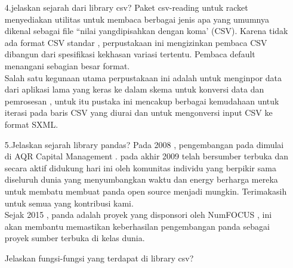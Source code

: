 \documentclass[10pt]{article}
\begin{document}
\begin{enumerate}
\item[4.jelaskan sejarah dari library csv?]
Paket csv-reading untuk racket menyediakan utilitas untuk membaca berbagai jenis apa yang umumnya dikenal sebagai file “nilai yangdipisahkan dengan koma’ (CSV). Karena tidak ada format CSV standar , perpustakaan ini mengizinkan pembaca CSV dibangun dari spesifikasi kekhasan variasi tertentu. Pembaca default menangani sebagian besar format.\\

Salah satu kegunaan utama perpustakaan ini adalah untuk menginpor data dari aplikasi lama yang keras ke dalam skema untuk konversi data dan pemrosesan , untuk itu pustaka ini mencakup berbagai kemudahaan  untuk iterasi pada baris CSV yang diurai dan untuk mengonversi input CSV ke format SXML.\\

\item[5.Jelaskan sejarah library pandas?]
Pada 2008 , pengembangan pada dimulai di AQR Capital Management . pada akhir 2009 telah bersumber terbuka dan secara aktif didukung hari ini oleh komunitas individu yang berpikir sama diseluruh dunia yang menyumbangkan waktu dan energy berharga mereka untuk membatu membuat panda open source menjadi mungkin. Terimakasih untuk semua yang kontribusi kami.\\

Sejak 2015 , panda adalah proyek yang disponsori oleh NumFOCUS , ini akan membantu memastikan keberhasilan pengembangan panda sebagai proyek sumber terbuka di kelas dunia.\\

\item[Jelaskan fungsi-fungsi yang terdapat di library csv?]

\end{enumerate}
\end{document}
